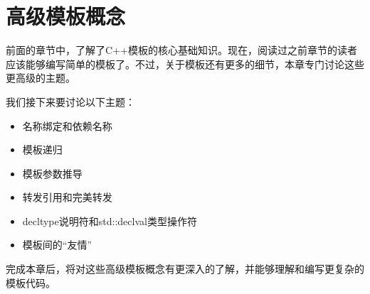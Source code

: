 \chapter{高级模板概念}
前面的章节中，了解了C++模板的核心基础知识。现在，阅读过之前章节的读者应该能够编写简单的模板了。不过，关于模板还有更多的细节，本章专门讨论这些更高级的主题。

我们接下来要讨论以下主题：

\begin{itemize}
  \item 名称绑定和依赖名称
  \item 模板递归
  \item 模板参数推导
  \item 转发引用和完美转发
  \item decltype说明符和std::declval类型操作符
  \item 模板间的“友情”
\end{itemize}

完成本章后，将对这些高级模板概念有更深入的了解，并能够理解和编写更复杂的模板代码。











